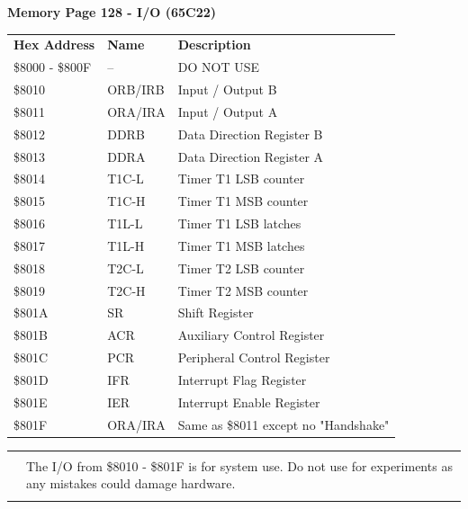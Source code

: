 \documentclass{ol-softwaremanual}
\newcommand{\Note}[1]{
\begin{table}[h]
\begin{tabular}{|p{0.1\textwidth}p{0.8\textwidth}|}
\hline
 & \\
\multicolumn{1}{|r}{\Huge\warning} & #1\\
 &  \\ \hline
\end{tabular}
\end{table}
}
\begin{document}
\begin{table}[H]
\centering
\textbf{Memory Page 128 - I/O (65C22)}\\
\begin{tabular}{|l|l|l|}
\cline{1-3}
\textbf{Hex Address} & \textbf{Name} & \textbf{Description}  \\ \cline{1-3}
\$8000 - \$800F & -- & DO NOT USE\\ \cline{1-3}
\$8010 & ORB/IRB & Input / Output B\\ \cline{1-3}
\$8011 & ORA/IRA & Input / Output A\\ \cline{1-3}
\$8012 & DDRB & Data Direction Register B\\ \cline{1-3}
\$8013 & DDRA & Data Direction Register A\\ \cline{1-3}
\$8014 & T1C-L & Timer T1 LSB counter\\ \cline{1-3}
\$8015 & T1C-H & Timer T1 MSB counter\\ \cline{1-3}
\$8016 & T1L-L & Timer T1 LSB latches\\ \cline{1-3}
\$8017 & T1L-H & Timer T1 MSB latches\\ \cline{1-3}
\$8018 & T2C-L & Timer T2 LSB counter\\ \cline{1-3}
\$8019 & T2C-H & Timer T2 MSB counter\\ \cline{1-3}
\$801A & SR & Shift Register\\ \cline{1-3}
\$801B & ACR & Auxiliary Control Register\\ \cline{1-3}
\$801C & PCR & Peripheral Control Register\\ \cline{1-3}
\$801D & IFR & Interrupt Flag Register\\ \cline{1-3}
\$801E & IER & Interrupt Enable Register\\ \cline{1-3}
\$801F & ORA/IRA & Same as \$8011 except no "Handshake"\\ \cline{1-3}
\end{tabular}
\end{table}
\Note{The I/O from \$8010 - \$801F is for system use. Do not use for experiments as any mistakes could damage hardware.}
\end{document}
